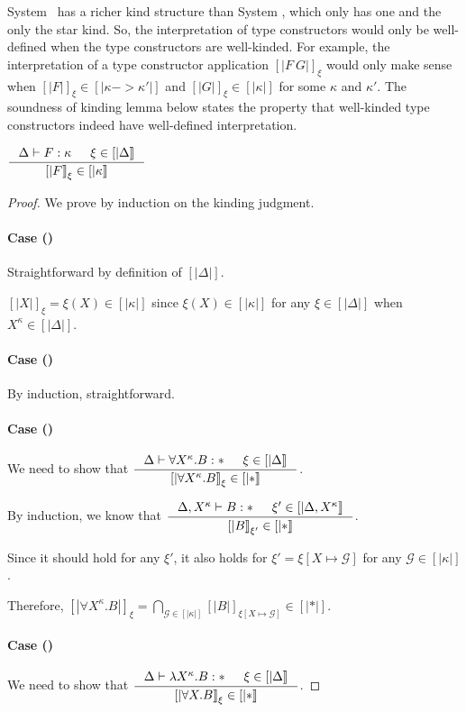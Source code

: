 System \Fw\ has a richer kind structure than System \F, which only has one and
the only the star kind. So, the interpretation of type constructors would only
be well-defined when the type constructors are well-kinded. For example,
the interpretation of a type constructor application $[|F~G|]_\xi$
would only make sense when $[|F|]_\xi\in[|\kappa -> \kappa'|]$
and $[|G|]_\xi\in[|\kappa|]$ for some $\kappa$ and $\kappa'$.
The soundness of kinding lemma below states the property that
well-kinded type constructors indeed have well-defined interpretation.
\begin{lemma}  \label{lem:fw:soundki}
$ \inference{\Delta |- F : \kappa & \xi\in[|\Delta|]}{[|F|]_\xi\in[|\kappa|]} $
\end{lemma}
\begin{proof}
We prove by induction on the kinding judgment.
\paragraph{Case ()}
Straightforward by definition of $[|\Delta|]$.

$[|X|]_\xi=\xi(X) \in [|\kappa|]$
since $\xi(X)\in[|\kappa|]$ for any $\xi\in[|\Delta|]$
when $X^\kappa \in [|\Delta|]$.

\paragraph{Case ()} By induction, straightforward.

\paragraph{Case ()}
We need to show that
$ \inference{\Delta |- \forall X^\kappa.B:* & \xi\in[|\Delta|]}
	{[|\forall X^\kappa.B|]_\xi\in[|*|]} $.

By induction, we know that
$ \inference{\Delta,X^\kappa |- B:* & \xi'\in[|\Delta,X^\kappa|]}
	{[|B|]_{\xi'} \in [|*|]} $.

Since it should hold for any $\xi'$, it also holds for
$\xi'=\xi[X\mapsto\mathcal{G}]$ for any $\mathcal{G}\in[|\kappa|]$.

Therefore,
$  [|\forall X^\kappa.B|]_\xi
 = \bigcap_{\mathcal{G}\in[|\kappa|]}[|B|]_{\xi[X\mapsto\mathcal{G}]}\in[|*|] $.

\paragraph{Case ()}
We need to show that
$ \inference{\Delta |- \l X^\kappa.B:* & \xi\in[|\Delta|]}
	{[|\forall X.B|]_\xi\in[|*|]} $.


\end{proof}
